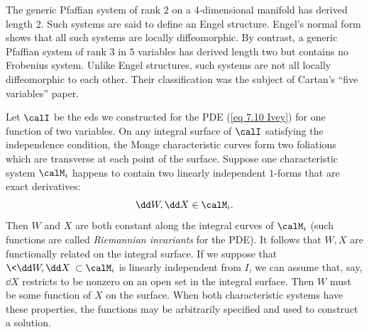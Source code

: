 The generic Pfaffian system of rank $2$ on a $4$-dimensional manifold has derived length $2$. Such systems are said to define an Engel structure. Engel's normal form shows that all such systems are locally diffeomorphic. By contrast, a generic Pfaffian system of rank $3$ in $5$ variables has derived length two but contains no Frobenius system. Unlike Engel structures, such systems are not all locally diffeomorphic to each other. Their classification was the subject of Cartan's ``five variables'' paper. 


Let $\calI$ be the \gls{eds} we constructed for the PDE (\ref{eq 7.10 Ivey}) for one function of two variables. On any integral surface of $\calI$ satisfying the independence condition, the Monge characteristic curves form two foliations which are transverse at each point of the surface. Suppose one characteristic system $\calM_i$ happens to contain two linearly independent $1$-forms that are exact derivatives:
\[\dd W,\dd X\in\calM_i.\]
Then $W$ and $X$ are both constant along the integral curves of $\calM_i$ (such functions are called \emph{Riemannian invariants} for the PDE). It follows that $W,X$ are functionally related on the integral surface. If we suppose that $\<\dd W,\dd X\>\subset \calM_i$ is linearly independent from $I$, we can assume that, say, $\dd X$ restricts to be nonzero on an open set in the integral surface. Then $W$ must be some function of $X$ on the surface. When both characteristic systems have these properties, the functions may be arbitrarily specified and used to construct a solution.


